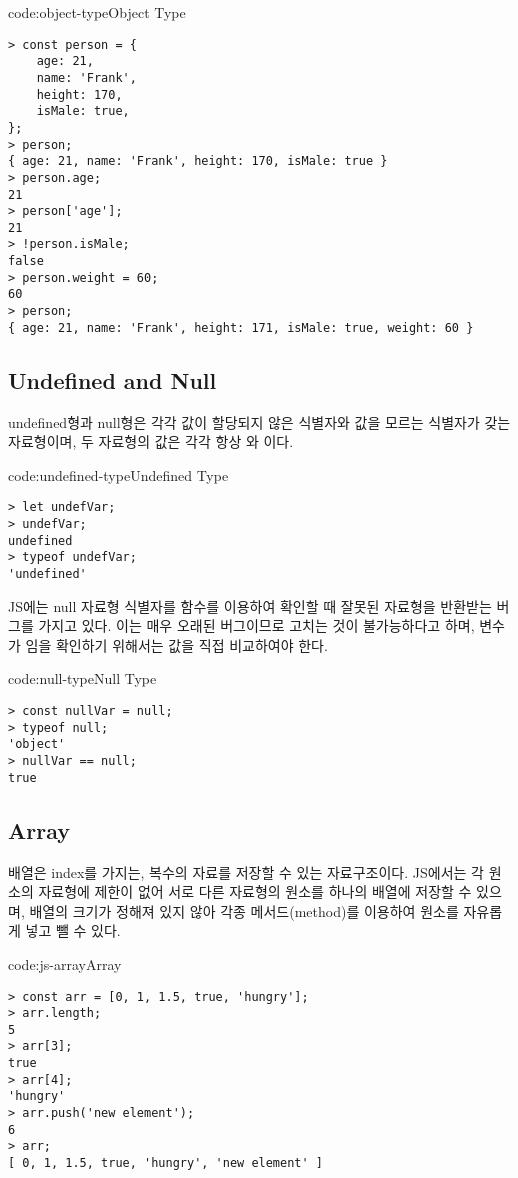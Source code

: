 \begin{codeenv}{code:object-type}{Object Type}\begin{verbatim}
> const person = {
    age: 21,
    name: 'Frank',
    height: 170,
    isMale: true,
};
> person;
{ age: 21, name: 'Frank', height: 170, isMale: true }
> person.age;
21
> person['age'];
21
> !person.isMale;
false
> person.weight = 60;
60
> person;
{ age: 21, name: 'Frank', height: 171, isMale: true, weight: 60 }
\end{verbatim}
\end{codeenv}

\subsection*{Undefined and Null}

undefined형과 null형은 각각 값이 할당되지 않은 식별자와 값을 모르는 식별자가 갖는 자료형이며, 두 자료형의 값은 각각 항상 와 이다.

\begin{codeenv}{code:undefined-type}{Undefined Type}\begin{verbatim}
> let undefVar;
> undefVar;
undefined
> typeof undefVar;
'undefined'
\end{verbatim}
\end{codeenv}

JS에는 null 자료형 식별자를  함수를 이용하여 확인할 때 잘못된 자료형을 반환받는 버그를 가지고 있다. 이는 매우 오래된 버그이므로 고치는 것이 불가능하다고 하며, 변수가 임을 확인하기 위해서는 값을 직접 비교하여야 한다.
\newpage

\begin{codeenv}{code:null-type}{Null Type}\begin{verbatim}
> const nullVar = null;
> typeof null;
'object'
> nullVar == null;
true
\end{verbatim}
\end{codeenv}

\subsection*{Array}

배열은 index를 가지는, 복수의 자료를 저장할 수 있는 자료구조이다. JS에서는 각 원소의 자료형에 제한이 없어 서로 다른 자료형의 원소를 하나의 배열에 저장할 수 있으며, 배열의 크기가 정해져 있지 않아 각종 메서드(method)를 이용하여 원소를 자유롭게 넣고 뺄 수 있다.

\begin{codeenv}{code:js-array}{Array}\begin{verbatim}
> const arr = [0, 1, 1.5, true, 'hungry'];
> arr.length;
5
> arr[3];
true
> arr[4];
'hungry'
> arr.push('new element');
6
> arr;
[ 0, 1, 1.5, true, 'hungry', 'new element' ]
\end{verbatim}
\end{codeenv}
